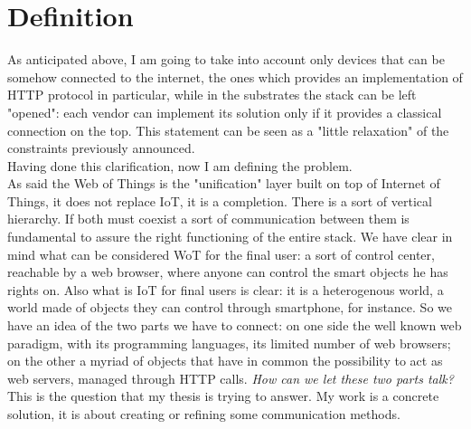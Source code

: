 \section{Definition} \label{problemdefinition}
As anticipated above, I am going to take into account only devices that can be somehow connected to the internet, the ones which provides an implementation of HTTP protocol in particular, while in the substrates the stack can be left "opened": each vendor can implement its solution only if it provides a classical connection on the top. This statement can be seen as a  "little relaxation" of the constraints previously announced.\\
Having done this clarification, now I am defining the problem. \\
As said the Web of Things is the "unification" layer built on top of Internet of Things, it does not replace IoT, it is a completion. There is a sort of vertical hierarchy. If both must coexist a sort of communication between them is fundamental to assure the right functioning of the entire stack. We have clear in mind what can be considered WoT for the final user: a sort of control center, reachable by a web browser, where anyone can control the smart objects he has rights on. Also what is IoT for final users is clear: it is a heterogenous world, a world made of objects they can control through smartphone, for instance. So we have an idea of the two parts we have to connect: on one side the well known web paradigm, with its programming languages, its limited number of web browsers; on the other a myriad of objects that have in common the possibility to act as web servers, managed through HTTP calls. \textit{How can we let these two parts talk?} This is the question that my thesis is trying to answer. My work is a concrete solution, it is about creating or refining some communication methods.\\
